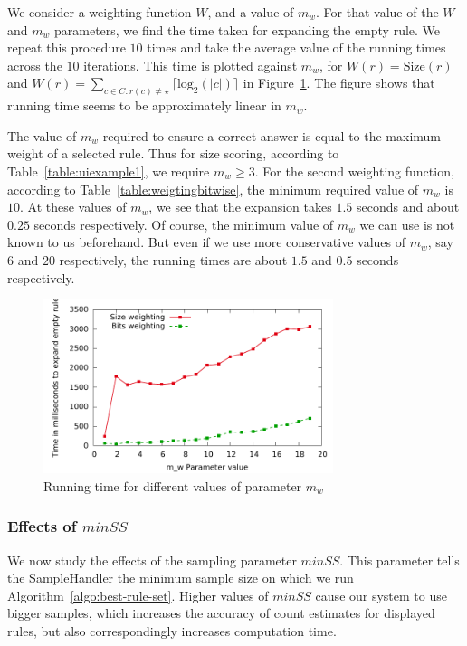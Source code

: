 We consider a weighting function $W$, and a value of $m_w$. For that value of the $W$ and $m_w$ parameters, we find the time taken for expanding the empty rule. We repeat this procedure $10$ times and take the average value of the running times across the $10$ iterations. This time is plotted against $m_w$, for $W(r) = \text{Size}(r)$ and $W(r) = \sum_{c \in C : r(c) \neq \star} \lceil \text{log}_2(|c|) \rceil$ in Figure~\ref{fig:mw_speed}. The figure shows that running time seems to be approximately linear in $m_w$. 

The value of $m_w$ required to ensure a correct answer is equal to the maximum weight of a selected rule. Thus for size scoring, according to Table~\ref{table:uiexample1}, we require $m_w \geq 3$. For the second weighting function, according to Table~\ref{table:weigtingbitwise}, the minimum required value of $m_w$ is $10$. At these values of $m_w$, we see that the expansion takes $1.5$ seconds and about $0.25$ seconds respectively. Of course, the minimum value of $m_w$ we can use is not known to us beforehand. But even if we use more conservative values of $m_w$, say $6$ and $20$ respectively, the running times are about $1.5$ and $0.5$ seconds respectively.

\begin{figure}
\hspace{-20pt}
  \includegraphics[height=2in]{graphs/mw_speed.pdf}%
\vspace{-10pt}
  \caption{Running time for different values of parameter $m_w$ \label{fig:mw_speed}}
\vspace{-13pt}
\end{figure}

\subsubsection{Effects of $minSS$}
We now study the effects of the sampling parameter $minSS$. This parameter tells the SampleHandler the minimum sample size on which we run Algorithm~\ref{algo:best-rule-set}.   Higher values of $minSS$ cause our system to use bigger samples, which increases the accuracy of count estimates for displayed rules, but also correspondingly increases computation time. 

